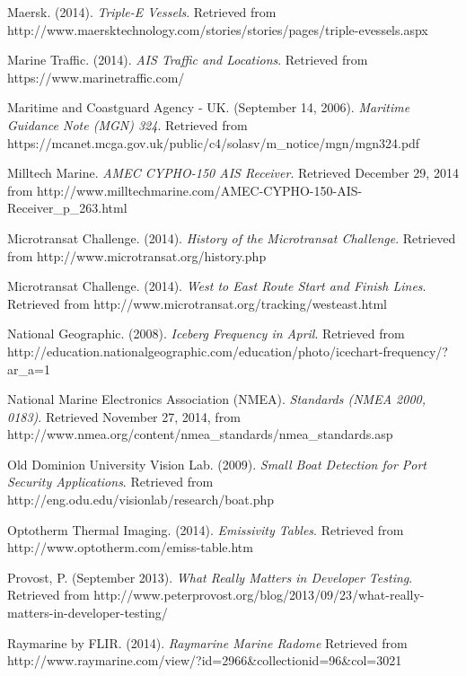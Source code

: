 \begin{thebibliography}{99}
 Maersk. (2014). \textit{Triple-E Vessels}. Retrieved from http://www.maersktechnology.com/stories/stories/pages/triple-evessels.aspx

 Marine Traffic. (2014). \textit{AIS Traffic and Locations}. Retrieved from https://www.marinetraffic.com/

 Maritime and Coastguard Agency - UK. (September 14, 2006). \textit{Maritime Guidance Note (MGN) 324}. Retrieved from https://mcanet.mcga.gov.uk/public/c4/solasv/m\_notice/mgn/mgn324.pdf

 Milltech Marine. \textit{AMEC CYPHO-150 AIS Receiver}. Retrieved December 29, 2014 from http://www.milltechmarine.com/AMEC-CYPHO-150-AIS-Receiver\_p\_263.html

 Microtransat Challenge. (2014). \textit{History of the Microtransat Challenge}. Retrieved from http://www.microtransat.org/history.php

 Microtransat Challenge. (2014). \textit{West to East Route Start and Finish Lines}. Retrieved from http://www.microtransat.org/tracking/westeast.html

 National Geographic. (2008). \textit{Iceberg Frequency in April}. Retrieved from http://education.nationalgeographic.com/education/photo/icechart-frequency/?ar\_a=1

 National Marine Electronics Association (NMEA). \textit{Standards (NMEA 2000, 0183)}. Retrieved November 27, 2014, from http://www.nmea.org/content/nmea\_standards/nmea\_standards.asp

 Old Dominion University Vision Lab. (2009). \textit{Small Boat Detection for Port Security Applications}. Retrieved from http://eng.odu.edu/visionlab/research/boat.php

 Optotherm Thermal Imaging. (2014). \textit{Emissivity Tables}. Retrieved from http://www.optotherm.com/emiss-table.htm

 Provost, P. (September 2013). \textit{What Really Matters in Developer Testing}. Retrieved from http://www.peterprovost.org/blog/2013/09/23/what-really-matters-in-developer-testing/

 Raymarine by FLIR. (2014). \textit{Raymarine Marine Radome} Retrieved from http://www.raymarine.com/view/?id=2966\&collectionid=96\&col=3021


\end{thebibliography}
